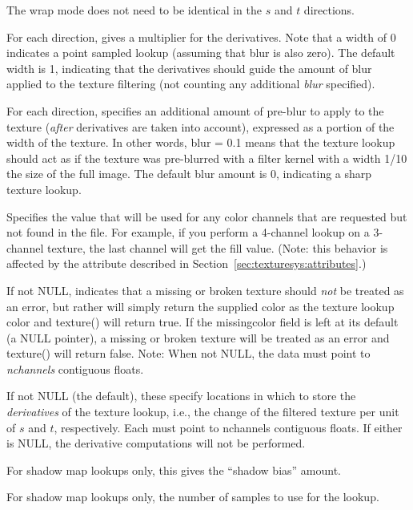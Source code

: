 The wrap mode does not need to be identical in the $s$ and $t$
directions.
\apiend

For each direction, gives a multiplier for the derivatives.  Note that
a width of 0 indicates a point sampled lookup (assuming that blur is
also zero).  The default width is 1, indicating that the derivatives
should guide the amount of blur applied to the texture filtering (not
counting any additional \emph{blur} specified).
\apiend

For each direction, specifies an additional amount of pre-blur to apply
to the texture (\emph{after} derivatives are taken into account),
expressed as a portion of the width of the texture.  In other words,
blur = 0.1 means that the texture lookup should act as if the texture
was pre-blurred with a filter kernel with a width 1/10 the size of the
full image.  The default blur amount is 0, indicating a sharp texture
lookup.
\apiend

Specifies the value that will be used for any color channels that are
requested but not found in the file.  For example, if you perform a
4-channel lookup on a 3-channel texture, the last channel will
get the fill value.  (Note: this behavior is affected by the
 attribute described in 
Section~\ref{sec:texturesys:attributes}.)
\apiend

If not NULL, indicates that a missing or broken texture should \emph{not}
be treated as an error, but rather will simply return the supplied color
as the texture lookup color and {\cf texture()} will return {\cf true}.  
If the {\cf missingcolor} field is left at its default (a NULL pointer),
a missing or broken texture will be treated as an error and
{\cf texture()} will return {\cf false}.
Note: When not NULL, the data must point to \emph{nchannels} contiguous floats.
\apiend

If not NULL (the default), these specify locations in which to store
the \emph{derivatives} of the texture lookup, i.e., the change of the
filtered texture per unit of $s$ and $t$, respectively.  Each must point
to {\cf nchannels} contiguous floats.  If either is NULL, the derivative
computations will not be performed.
\apiend

For shadow map lookups only, this gives the ``shadow bias'' amount.
\apiend

For shadow map lookups only, the number of samples to use for the lookup.
\apiend

